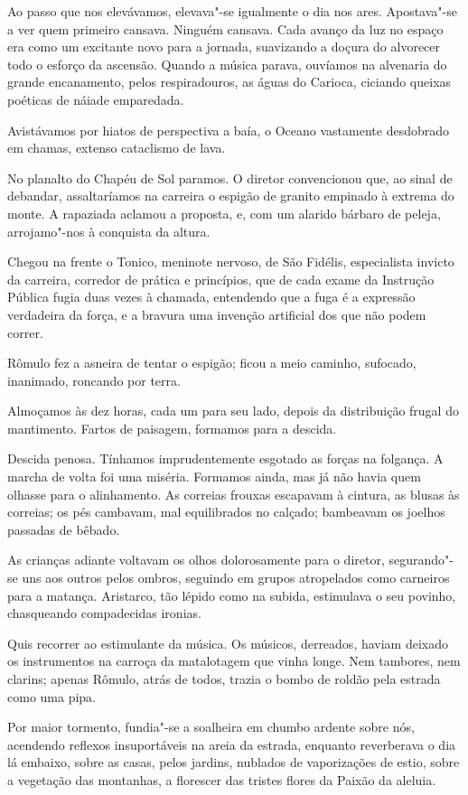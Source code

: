Ao passo que nos elevávamos, elevava"-se
igualmente o dia nos ares. Apostava"-se a ver quem primeiro cansava.
Ninguém cansava. Cada avanço da luz no espaço era como um excitante
novo para a jornada, suavizando a doçura do alvorecer todo o esforço da
ascensão. Quando a música parava, ouvíamos na alvenaria do grande
encanamento, pelos respiradouros, as águas do Carioca, ciciando queixas
poéticas de náiade emparedada. 

Avistávamos por hiatos de perspectiva a baía, o Oceano 
vastamente desdobrado em chamas, extenso cataclismo de lava. 

No planalto do Chapéu de Sol paramos. O diretor convencionou que,
ao sinal de debandar, assaltaríamos na carreira o espigão de granito
empinado à extrema do monte. A rapaziada aclamou a proposta, e, com um
alarido bárbaro de peleja, arrojamo"-nos à conquista da altura. 

Chegou na frente o Tonico, meninote nervoso, de São Fidélis, especialista
invicto da carreira, corredor de prática e princípios, que de cada
exame da Instrução Pública fugia duas vezes à chamada, entendendo que a
fuga é a expressão verdadeira da força, e a bravura uma invenção
artificial dos que não podem correr. 

Rômulo fez a asneira de tentar o
espigão; ficou a meio caminho, sufocado, inanimado, roncando por terra.

Almoçamos às dez horas, cada um para seu lado, depois da distribuição
frugal do mantimento. Fartos de paisagem, formamos para a descida.

Descida penosa. Tínhamos imprudentemente esgotado as forças na
folgança. A marcha de volta foi uma miséria. Formamos ainda, mas já não
havia quem olhasse para o alinhamento. As correias frouxas escapavam à
cintura, as blusas às correias; os pés cambavam, mal equilibrados no
calçado; bambeavam os joelhos passadas de bêbado. 

As crianças adiante voltavam os olhos dolorosamente para o diretor, 
segurando"-se uns aos
outros pelos ombros, seguindo em grupos atropelados como carneiros para
a matança. Aristarco, tão lépido como na subida, estimulava o seu
povinho, chasqueando compadecidas ironias. 

Quis recorrer ao estimulante
da música. Os músicos, derreados, haviam deixado os instrumentos na
carroça da matalotagem que vinha longe. Nem tambores, nem clarins;
apenas Rômulo, atrás de todos, trazia o bombo de roldão pela estrada
como uma pipa. 

Por maior tormento, fundia"-se a soalheira em chumbo
ardente sobre nós, acendendo reflexos insuportáveis na areia da
estrada, enquanto reverberava o dia lá embaixo, sobre as casas, pelos
jardins, nublados de vaporizações de estio, sobre a vegetação das
montanhas, a florescer das tristes flores da Paixão da aleluia.

